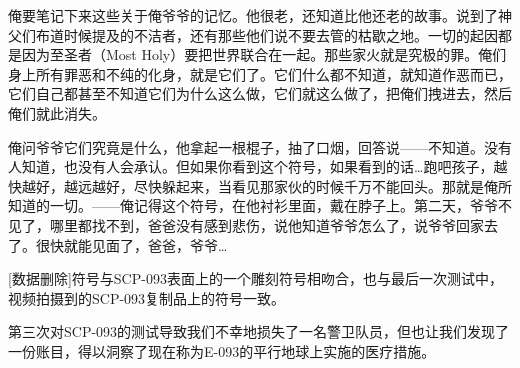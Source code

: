 \begin{scpbox}
俺要笔记下来这些关于俺爷爷的记忆。他很老，还知道比他还老的故事。说到了神父们布道时候提及的不洁者，还有那些他们说不要去管的枯歇之地。一切的起因都是因为至圣者（Most Holy）要把世界联合在一起。那些家火就是究极的罪。俺们身上所有罪恶和不纯的化身，就是它们了。它们什么都不知道，就知道作恶而已，它们自己都甚至不知道它们为什么这么做，它们就这么做了，把俺们拽进去，然后俺们就此消失。

俺问爷爷它们究竟是什么，他拿起一根棍子，抽了口烟，回答说——不知道。没有人知道，也没有人会承认。但如果你看到这个符号，如果看到的话…跑吧孩子，越快越好，越远越好，尽快躲起来，当看见那家伙的时候千万不能回头。那就是俺所知道的一切。——俺记得这个符号，在他衬衫里面，戴在脖子上。第二天，爷爷不见了，哪里都找不到，爸爸没有感到悲伤，说他知道爷爷怎么了，说爷爷回家去了。很快就能见面了，爸爸，爷爷…

{[}数据删除]符号与SCP-093表面上的一个雕刻符号相吻合，也与最后一次测试中，视频拍摄到的SCP-093复制品上的符号一致。

\end{scpbox}

\begin{scpdialog}
\end{scpdialog}

第三次对SCP-093的测试导致我们不幸地损失了一名警卫队员，但也让我们发现了一份账目，得以洞察了现在称为E-093的平行地球上实施的医疗措施。

